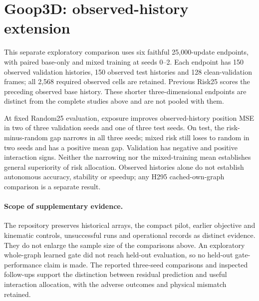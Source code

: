 \section{Goop3D: observed-history extension}
\label{sec:goop3d-25k-exposure}
This separate exploratory comparison uses six faithful 25,000-update endpoints, with paired base-only and mixed training at seeds 0--2. Each endpoint has 150 observed validation histories, 150 observed test histories and 128 clean-validation frames; all 2,568 required observed cells are retained. Previous Risk25 scores the preceding observed base history. These shorter three-dimensional endpoints are distinct from the complete studies above and are not pooled with them.


At fixed Random25 evaluation, exposure improves observed-history position MSE in two of three validation seeds and one of three test seeds. On test, the risk-minus-random gap narrows in all three seeds; mixed risk still loses to random in two seeds and has a positive mean gap. Validation has negative and positive interaction signs. Neither the narrowing nor the mixed-training mean establishes general superiority of risk allocation. Observed histories alone do not establish autonomous accuracy, stability or speedup; any H295 cached-own-graph comparison is a separate result.


\paragraph{Scope of supplementary evidence.}
The repository preserves historical arrays, the compact pilot, earlier objective and kinematic controls, unsuccessful runs and operational records as distinct evidence. They do not enlarge the sample size of the comparisons above. An exploratory whole-graph learned gate did not reach held-out evaluation, so no held-out gate-performance claim is made. The reported three-seed comparisons and inspected follow-ups support the distinction between residual prediction and useful interaction allocation, with the adverse outcomes and physical mismatch retained.
